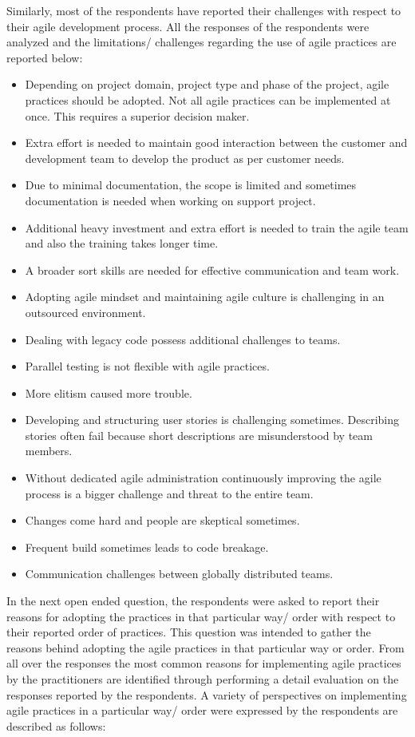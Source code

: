 \documentclass[a4paper,oneside]{bth}
\begin{document}
Similarly, most of the respondents have reported their challenges with respect to their agile development process. All the responses of the respondents were analyzed and the limitations/ challenges regarding the use of agile practices are reported below:
\begin{itemize}
\item Depending on project domain, project type and phase of the project, agile practices should be adopted. Not all agile practices can be implemented at once. This requires a superior decision maker.
\item 	Extra effort is needed to maintain good interaction between the customer and development team to develop the product as per customer needs.
\item	Due to minimal documentation, the scope is limited and sometimes documentation is needed when working on support project.
\item	Additional heavy investment and extra effort is needed to train the agile team and also the training takes longer time.
\item	A broader sort skills are needed for effective communication and team work.
\item	Adopting agile mindset and maintaining agile culture is challenging in an outsourced environment.
\item	Dealing with legacy code possess additional challenges to teams.
\item	Parallel testing is not flexible with agile practices.
\item	More elitism caused more trouble.
\item	Developing and structuring user stories is challenging sometimes. Describing stories often fail because short descriptions are misunderstood by team members.
\item	Without dedicated agile administration continuously improving the agile process is a bigger challenge and threat to the entire team.
\item	Changes come hard and people are skeptical sometimes.
\item	Frequent build sometimes leads to code breakage.
\item	Communication challenges between globally distributed teams.
\end{itemize}

In the next open ended question, the respondents were asked to report their reasons for adopting the practices in that particular way/ order with respect to their reported order of practices. This question was intended to gather the reasons behind adopting the agile practices in that particular way or order. From all over the responses the most common reasons for implementing agile practices by the practitioners are identified through performing a detail evaluation on the responses reported by the respondents. A variety of perspectives on implementing agile practices in a particular way/ order were expressed by the respondents are described as follows:
\end{document}
